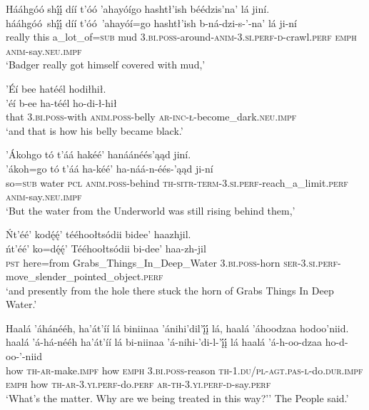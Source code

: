 \ea\label{ex:text4-5-7}
Hááhgóó shį́į́ díí t’óó ’ahayóígo hashtł’ish béédzis’na’ lá jiní.\\
\gll hááhgóó~{shį́į́}	díí	t’óó~{’ahayóí=go}	hashtł’ish	b-ná-dzi-s-’-na’	lá	ji-ní\\
     really	this	a\_lot\_of=\textsc{sub}	mud	3.\textsc{bi}.\textsc{poss}-around-\textsc{anim}-3.\textsc{si}.\textsc{perf}-\textsc{d}-crawl.\textsc{perf}	\textsc{emph}	\textsc{anim}-say.\textsc{neu}.\textsc{impf}\\
\glt `Badger really got himself covered with mud,'
\z

\ea\label{ex:text4-5-8}
’Éí bee hatéél hodiłhił.\\
\gll ’éí	b-ee	ha-téél	ho-di-ł-hił\\
     that	3.\textsc{bi}.\textsc{poss}-with	\textsc{anim}.\textsc{poss}-belly	\textsc{ar}-\textsc{inc}-\textsc{ł}-become\_dark.\textsc{neu}.\textsc{impf}\\
\glt `and that is how his belly became black.'
\z

\ea\label{ex:text4-6-1}
’Ákohgo tó t’áá hakéé’ hanáánéés’ąąd jiní.\\
\gll ’ákoh=go	tó	t’áá	ha-kéé’	ha-náá-n-éés-’ąąd	ji-ní\\
     so=\textsc{sub}	water	\textsc{pcl}	\textsc{anim}.\textsc{poss}-behind	\textsc{th}-\textsc{sitr}-\textsc{term}-3.\textsc{si}.\textsc{perf}-reach\_a\_limit.\textsc{perf}	\textsc{anim}-say.\textsc{neu}.\textsc{impf}\\
\glt `But the water from the Underworld was still rising behind them,'
\z

\ea\label{ex:text4-6-2}
Ńt’éé’ kodę́ę́’ tééhoołtsódii bidee’ haazhjil.\\
\gll ńt’éé’	ko=dę́ę́’	Tééhoołtsódii	bi-dee’	haa-zh-jil\\
     \textsc{pst}	here=from	Grabs\_Things\_In\_Deep\_Water	3.\textsc{bi}.\textsc{poss}-horn	\textsc{ser}-3.\textsc{si}.\textsc{perf}-move\_slender\_pointed\_object.\textsc{perf}\\
\glt `and presently from the hole there stuck the horn of Grabs Things In Deep Water.'
\z

\ea\label{ex:text4-6-3}
Haalá ’áhánééh, ha’át’íí lá biniinaa ’ánihi’dil’į́į́ lá, haalá ’áhoodzaa hodoo’niid.\\
\gll haalá	’á-há-nééh	ha’át’íí	lá	bi-niinaa	’á-nihi-’di-l-’į́į́	lá	haalá	’á-h-oo-dzaa	ho-d-oo-’-niid\\
     how	\textsc{th}-\textsc{ar}-make.\textsc{impf}	how	\textsc{emph}	3.\textsc{bi}.\textsc{poss}-reason	\textsc{th}-1.\textsc{du}/\textsc{pl}-\textsc{agt}.\textsc{pas}-\textsc{l}-do.\textsc{dur}.\textsc{impf}	\textsc{emph}	how	\textsc{th}-\textsc{ar}-3.\textsc{yi}.\textsc{perf}-do.\textsc{perf}	\textsc{ar}-\textsc{th}-3.\textsc{yi}.\textsc{perf}-\textsc{d}-say.\textsc{perf}\\
\glt `What's the matter. Why are we being treated in this way?'' The People said.'
\z

